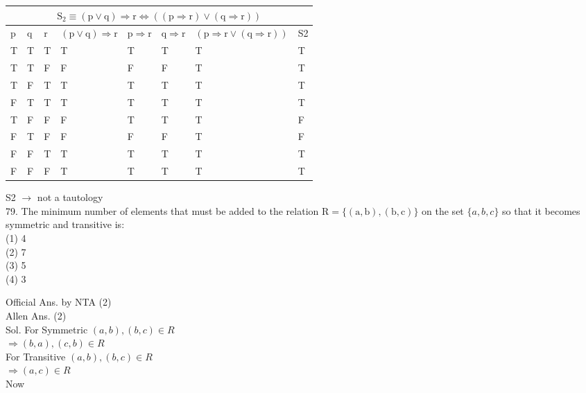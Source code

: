 \documentclass[10pt]{article}
\begin{document}
\begin{center}
\begin{tabular}{|l|l|l|l|l|l|l|l|}
\hline
\multicolumn{8}{|c|}{\(\mathrm{S}_{2} \equiv(\mathrm{p} \vee \mathrm{q}) \Rightarrow \mathrm{r} \Leftrightarrow((\mathrm{p} \Rightarrow \mathrm{r}) \vee(\mathrm{q} \Rightarrow \mathrm{r}))\)} \\
\hline
p & q & r & \((\mathrm{p} \vee \mathrm{q}) \Rightarrow \mathrm{r}\) & \(\mathrm{p} \Rightarrow \mathrm{r}\) & \(\mathrm{q} \Rightarrow \mathrm{r}\) & \((\mathrm{p} \Rightarrow \mathrm{r} \vee(\mathrm{q} \Rightarrow \mathrm{r}))\) & S2 \\
\hline
T & T & T & T & T & T & T & T \\
\hline
T & T & F & F & F & F & T & T \\
\hline
T & F & T & T & T & T & T & T \\
\hline
F & T & T & T & T & T & T & T \\
\hline
T & F & F & F & T & T & T & F \\
\hline
F & T & F & F & F & F & T & F \\
\hline
F & F & T & T & T & T & T & T \\
\hline
F & F & F & T & T & T & T & T \\
\hline
\end{tabular}
\end{center}

S2 \(\rightarrow\) not a tautology\\
79. The minimum number of elements that must be added to the relation \(\mathrm{R}=\{(\mathrm{a}, \mathrm{b}),(\mathrm{b}, \mathrm{c})\}\) on the set \(\{a, b, c\}\) so that it becomes symmetric and transitive is:\\
(1) 4\\
(2) 7\\
(3) 5\\
(4) 3

Official Ans. by NTA (2)\\
Allen Ans. (2)\\
Sol. For Symmetric \((a, b),(b, c) \in R\)\\
\(\Rightarrow(b, a),(c, b) \in R\)\\
For Transitive \((a, b),(b, c) \in R\)\\
\(\Rightarrow(a, c) \in R\)\\
Now
\end{document}
